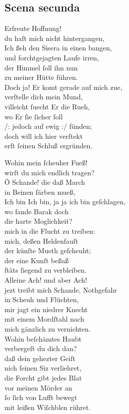 \documentclass{ees}
\newenvironment{lyrics}[1]{%
  \subsection{#1}\nopagebreak%
  \begin{lyricslist}%
  \let\voice\item%
}{%
  \end{lyricslist}%
}
\begin{document}
\begin{lyrics}{Scena secunda}
  \voice[Jahel]
  Erfreute Hoffnung!\\
  du haſt mich nicht hintergangen,\\
  Ich ßeh den Sisera in einen bangen,\\
  und forchtgejagten Laufe irren,\\
  der Himmel ſoll ihn nun\\
  zu meiner Hütte führen.\\
  Doch ja! Er komt gerade auf mich zue,\\
  verſtelle dich mein Mund,\\
  villeicht ſuecht Er die Rueh,\\
  wo Er ſie ſicher ſoll\\
  /: jedoch auf ewig :/ fünden;\\
  doch will ich hier verſtekt\\
  erſt ſeinen Schluß ergründen.

  \voice[Sisera]
  Wohin mein ſcheuher Fueß!\\
  wirſt du mich endlich tragen?\\
  Ô Schande! die daß March\\
  in Beinen färben mueß,\\
  Ich bin Ich bin, ja ja ich bin geſchlagen,\\
  wo fande Barak doch\\
  die harte Moglichkeit?\\
  mich in die Flucht zu treiben:\\
  mich, deßen Heldenfauſt\\
  der künſte Mueth geſcheuht;\\
  der eine Kunſt beßaß\\
  ſtäts ſiegend zu verbleiben.\\
  Alleine Ach! und aber Ach!\\
  jezt treibt mich Schande, Nothgefahr\\
  in Scheuh und Flüchten,\\
  mir jagt ein niedrer Knecht\\
  mit einem Mordſtahl nach\\
  mich gänzlich zu vernichten.\\
  Wohin beſchämtes Haubt\\
  verbergeſt du dich dan?\\
  daß dein gehezter Geiſt\\
  nich ſeinen Siz verliehret,\\
  die Forcht gibt jedes Blat\\
  vor meinen Mörder an\\
  ſo ſich von Lufft bewegt\\
  mit leißen Wiſchblen rühret.
\end{lyrics}
\end{document}
